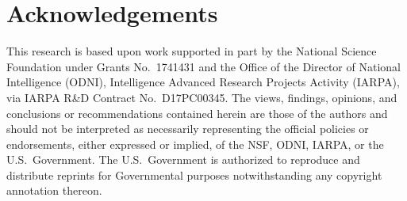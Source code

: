 \documentclass{bmvc2k}
\begin{document}
\section{Acknowledgements}
This research is based upon work supported in part by the National Science Foundation under Grants No.\ 1741431 and the Office of the Director of National Intelligence (ODNI), Intelligence Advanced Research Projects Activity (IARPA), via IARPA R\&D Contract No.\ D17PC00345. The views, findings, opinions, and conclusions or recommendations contained herein are those of the authors and should not be interpreted as necessarily representing the official policies or endorsements, either expressed or implied, of the NSF, ODNI, IARPA, or the U.S.\ Government. The U.S.\ Government is authorized to reproduce and distribute reprints for Governmental purposes notwithstanding any copyright annotation thereon.





\end{document}
